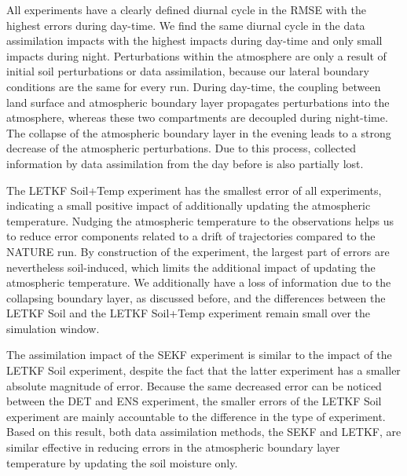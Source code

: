 \documentclass[hess, manuscript]{copernicus}
\begin{document}
All experiments have a clearly defined diurnal cycle in the RMSE with the highest errors during day-time.
We find the same diurnal cycle in the data assimilation impacts with the highest impacts during day-time and only small impacts during night.
Perturbations within the atmosphere are only a result of initial soil perturbations or data assimilation, because our lateral boundary conditions are the same for every run.
During day-time, the coupling between land surface and atmospheric boundary layer propagates perturbations into the atmosphere, whereas these two compartments are decoupled during night-time. 
The collapse of the atmospheric boundary layer in the evening leads to a strong decrease of the atmospheric perturbations.
Due to this process, collected information by data assimilation from the day before is also partially lost.

The LETKF Soil+Temp experiment has the smallest error of all experiments, indicating a small positive impact of additionally updating the atmospheric temperature.
Nudging the atmospheric temperature to the observations helps us to reduce error components related to a drift of trajectories compared to the NATURE run.
By construction of the experiment, the largest part of errors are nevertheless soil-induced, which limits the additional impact of updating the atmospheric temperature.
We additionally have a loss of information due to the collapsing boundary layer, as discussed before, and the differences between the LETKF Soil and the LETKF Soil+Temp experiment remain small over the simulation window.

The assimilation impact of the SEKF experiment is similar to the impact of the LETKF Soil experiment, despite the fact that the latter experiment has a smaller absolute magnitude of error.
Because the same decreased error can be noticed between the DET and ENS experiment, the smaller errors of the LETKF Soil experiment are mainly accountable to the difference in the type of experiment.
Based on this result, both data assimilation methods, the SEKF and LETKF, are similar effective in reducing errors in the atmospheric boundary layer temperature by updating the soil moisture only.\\
\end{document}
